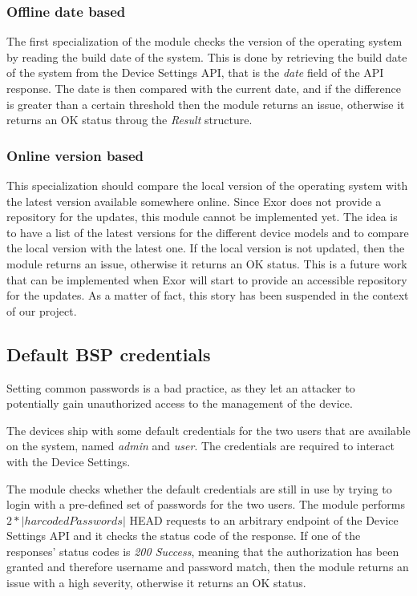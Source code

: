 \subsubsection{Offline date based}

The first specialization of the module checks the version of the operating system by reading the build date of the system. This is done by retrieving the build date of the system from the Device Settings API, that is the \textit{date} field of the API response. The date is then compared with the current date, and if the difference is greater than a certain threshold then the module returns an issue, otherwise it returns an OK status throug the \textit{Result} structure.

\subsubsection{Online version based}

This specialization should compare the local version of the operating system with the latest version available somewhere online. Since Exor does not provide a repository for the updates, this module cannot be implemented yet. The idea is to have a list of the latest versions for the different device models and to compare the local version with the latest one. If the local version is not updated, then the module returns an issue, otherwise it returns an OK status. This is a future work that can be implemented when Exor will start to provide an accessible repository for the updates. As a matter of fact, this story has been suspended in the context of our project.

\subsection{Default BSP credentials}

Setting common passwords is a bad practice, as they let an attacker to potentially gain unauthorized access to the management of the device.

The devices ship with some default credentials for the two users that are available on the system, named \textit{admin} and \textit{user}. The credentials are required to interact with the Device Settings.

The module checks whether the default credentials are still in use by trying to login with a pre-defined set of passwords for the two users. The module performs $2*|harcodedPasswords|$ HEAD requests to an arbitrary endpoint of the Device Settings API and it checks the status code of the response. If one of the responses' status codes is \textit{200 Success}, meaning that the authorization has been granted and therefore username and password match, then the module returns an issue with a high severity, otherwise it returns an OK status.

